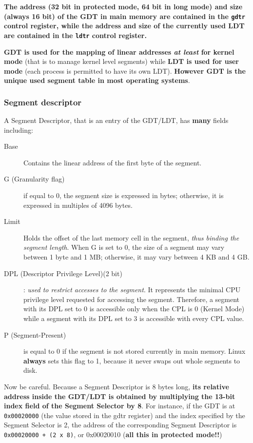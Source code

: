 \documentclass[10pt,a4paper]{article}
\begin{document}
\textbf{The address (32 bit in protected mode, 64 bit in long mode) and size (always 16 bit) of the GDT in main memory are contained in the \texttt{gdtr} control register, while the address and size of the currently used LDT are contained in the \texttt{ldtr} control register.}

\textbf{GDT is used for the mapping of linear addresses \textit{at least} for kernel mode} (that is to manage kernel level segments) while \textbf{LDT is used for user mode} (each process is permitted to have its own LDT). \textbf{However GDT is the unique used segment table in most operating systems}.

\subsubsection{Segment descriptor}

A Segment Descriptor, that is an entry of the GDT/LDT, has \textbf{many} fields including:
\begin{description}
\item[Base] Contains the linear address of the first byte of the segment.
\item[G (Granularity flag)] if equal to 0, the segment size is expressed in bytes; otherwise, it is expressed in multiples of 4096 bytes.
\item[Limit] Holds the offset of the last memory cell in the segment, \textit{thus binding the segment length}. When G is set to 0, the size of a segment may vary between 1 byte and 1 MB; otherwise, it may vary between 4 KB and 4 GB.
\item[DPL (Descriptor Privilege Level)(2 bit)]: \textit{used to restrict accesses to the segment}. It represents the minimal CPU privilege level requested for accessing the segment. Therefore, a segment with its DPL set to 0 is accessible only when the CPL is 0 (Kernel Mode) while a segment with its DPL set to 3 is accessible with every CPL value.
\item[P (Segment-Present)] is equal to 0 if the segment is not stored currently in main memory. Linux \textbf{always} sets this flag to 1, because it never swaps out whole segments to disk.
\end{description}

Now be careful. Because a Segment Descriptor is 8 bytes long, \textbf{its relative address inside the GDT/LDT is obtained by multiplying the 13-bit index field of the Segment Selector by 8}. For instance, if the GDT is at \texttt{0x00020000} (the value stored in the gdtr register) and the index specified by the Segment Selector is 2, the address of the corresponding Segment Descriptor is \texttt{0x00020000 + (2 x 8)}, or 0x00020010 (\textbf{all this in protected mode!!})
\end{document}
